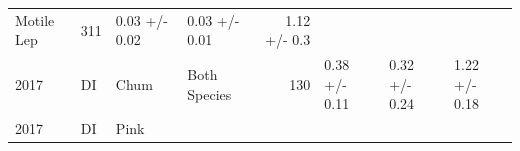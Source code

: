 \documentclass[fleqn,10pt]{wlpeerj} %
\begin{document}
\begin{longtable}[]{@{}llllrlll@{}}
\begin{minipage}[t]{0.11\columnwidth}
Motile Lep\strut
\end{minipage} & \begin{minipage}[t]{0.04\columnwidth}\raggedleft\strut
311\strut
\end{minipage} & \begin{minipage}[t]{0.14\columnwidth}\raggedright\strut
0.03 +/- 0.02\strut
\end{minipage} & \begin{minipage}[t]{0.14\columnwidth}\raggedright\strut
0.03 +/- 0.01\strut
\end{minipage} & \begin{minipage}[t]{0.14\columnwidth}\raggedright\strut
1.12 +/- 0.3\strut
\end{minipage}\tabularnewline
\begin{minipage}[t]{0.09\columnwidth}\raggedright\strut
2017\strut
\end{minipage} & \begin{minipage}[t]{0.06\columnwidth}\raggedright\strut
DI\strut
\end{minipage} & \begin{minipage}[t]{0.06\columnwidth}\raggedright\strut
Chum\strut
\end{minipage} & \begin{minipage}[t]{0.11\columnwidth}\raggedright\strut
Both Species\strut
\end{minipage} & \begin{minipage}[t]{0.04\columnwidth}\raggedleft\strut
130\strut
\end{minipage} & \begin{minipage}[t]{0.14\columnwidth}\raggedright\strut
0.38 +/- 0.11\strut
\end{minipage} & \begin{minipage}[t]{0.14\columnwidth}\raggedright\strut
0.32 +/- 0.24\strut
\end{minipage} & \begin{minipage}[t]{0.14\columnwidth}\raggedright\strut
1.22 +/- 0.18\strut
\end{minipage}\tabularnewline
\begin{minipage}[t]{0.09\columnwidth}\raggedright\strut
2017\strut
\end{minipage} & \begin{minipage}[t]{0.06\columnwidth}\raggedright\strut
DI\strut
\end{minipage} & \begin{minipage}[t]{0.06\columnwidth}\raggedright\strut
Pink\strut
\end{minipage} & \begin{minipage}[t]{0.11\columnwidth}\raggedright\strut

\end{minipage}
\end{longtable}
\end{document}
